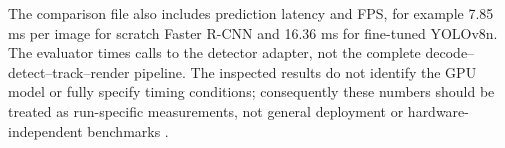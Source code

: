 The comparison file also includes prediction latency and FPS, for example 7.85 ms per image for scratch Faster R-CNN and 16.36 ms for fine-tuned YOLOv8n. The evaluator times calls to the detector adapter, not the complete decode--detect--track--render pipeline. The inspected results do not identify the GPU model or fully specify timing conditions; consequently these numbers should be treated as run-specific measurements, not general deployment or hardware-independent benchmarks \cite{evaluationcode,comparison}.
